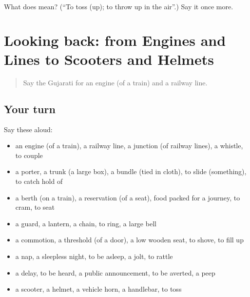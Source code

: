 \begin{tcolorbox}[breakable,colback=teal!4,colframe=teal!35!black,title={Before you move on}]
What does  mean? (\textquotedblleft{}To toss (up); to throw up in the air\textquotedblright{}.) Say it once more.
\end{tcolorbox}
\section[(dialogue)]{Looking back: from Engines and Lines to Scooters and Helmets}

\label{lesson:GU-R400-review-393-400}



\begin{quote}
Say the Gujarati for an engine (of a train) and a railway line.
\end{quote}

\subsection*{Your turn}
Say these aloud:

\begin{itemize}
\raggedright
  \item an engine (of a train), a railway line, a junction (of railway lines), a whistle, to couple
  \item a porter, a trunk (a large box), a bundle (tied in cloth), to slide (something), to catch hold of
  \item a berth (on a train), a reservation (of a seat), food packed for a journey, to cram, to seat
  \item a guard, a lantern, a chain, to ring, a large bell
  \item a commotion, a threshold (of a door), a low wooden seat, to shove, to fill up
  \item a nap, a sleepless night, to be asleep, a jolt, to rattle
  \item a delay, to be heard, a public announcement, to be averted, a peep
  \item a scooter, a helmet, a vehicle horn, a handlebar, to toss
\end{itemize}

